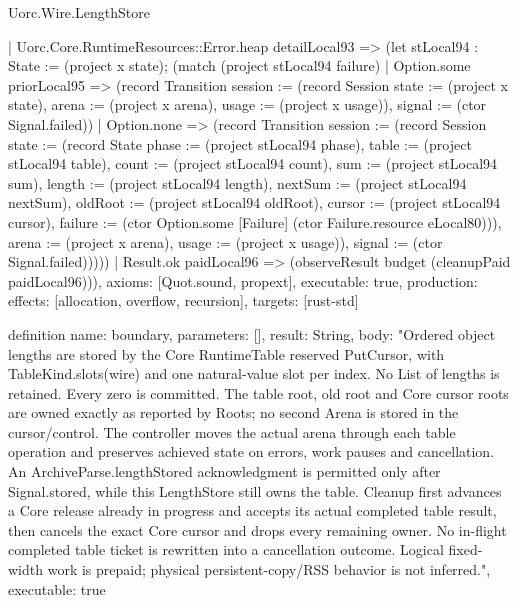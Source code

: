 \begin{lexlean}{Uorc.Wire.LengthStore}
\begin{semanticmodule}
{      | Uorc.Core.RuntimeResources::Error.heap detailLocal93 => (let stLocal94 : State := (project x state); (match (project stLocal94 failure)
        | Option.some priorLocal95 => (record Transition {session := (record Session {state := (project x state), arena := (project x arena), usage := (project x usage)}), signal := (ctor Signal.failed)})
        | Option.none => (record Transition {session := (record Session {state := (record State {phase := (project stLocal94 phase), table := (project stLocal94 table), count := (project stLocal94 count), sum := (project stLocal94 sum), length := (project stLocal94 length), nextSum := (project stLocal94 nextSum), oldRoot := (project stLocal94 oldRoot), cursor := (project stLocal94 cursor), failure := (ctor Option.some [Failure] (ctor Failure.resource eLocal80))}), arena := (project x arena), usage := (project x usage)}), signal := (ctor Signal.failed)}))))
    | Result.ok paidLocal96 => (observeResult budget (cleanupPaid paidLocal96))),
  axioms: [Quot.sound, propext],
  executable: true,
  production: {effects: [allocation, overflow, recursion], targets: [rust-std]}
}

definition{
  name: boundary,
  parameters: [],
  result: String,
  body: "Ordered object lengths are stored by the Core RuntimeTable reserved PutCursor, with TableKind.slots(wire) and one natural-value slot per index. No List of lengths is retained. Every zero is committed. The table root, old root and Core cursor roots are owned exactly as reported by Roots; no second Arena is stored in the cursor/control. The controller moves the actual arena through each table operation and preserves achieved state on errors, work pauses and cancellation. An ArchiveParse.lengthStored acknowledgment is permitted only after Signal.stored, while this LengthStore still owns the table. Cleanup first advances a Core release already in progress and accepts its actual completed table result, then cancels the exact Core cursor and drops every remaining owner. No in-flight completed table ticket is rewritten into a cancellation outcome. Logical fixed-width work is prepaid; physical persistent-copy/RSS behavior is not inferred.",
  executable: true
}
\end{semanticmodule}
\end{lexlean}
